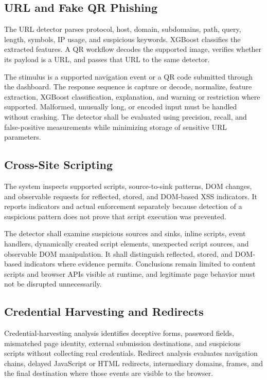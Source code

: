 \subsection{URL and Fake QR Phishing}
The URL detector parses protocol, host, domain, subdomains, path, query, length,
symbols, IP usage, and suspicious keywords. XGBoost classifies the extracted
features. A QR workflow decodes the supported image, verifies whether its payload
is a URL, and passes that URL to the same detector.

The stimulus is a supported navigation event or a QR code submitted through the
dashboard. The response sequence is capture or decode, normalize, feature
extraction, XGBoost classification, explanation, and warning or restriction where
supported. Malformed, unusually long, or encoded input must be handled without
crashing. The detector shall be evaluated using precision, recall, and
false-positive measurements while minimizing storage of sensitive URL parameters.

\subsection{Cross-Site Scripting}
The system inspects supported scripts, source-to-sink patterns, DOM changes, and
observable requests for reflected, stored, and DOM-based XSS indicators. It reports
indicators and actual enforcement separately because detection of a suspicious
pattern does not prove that script execution was prevented.

The detector shall examine suspicious sources and sinks, inline scripts, event
handlers, dynamically created script elements, unexpected script sources, and
observable DOM manipulation. It shall distinguish reflected, stored, and DOM-based
indicators where evidence permits. Conclusions remain limited to content scripts
and browser APIs visible at runtime, and legitimate page behavior must not be
disrupted unnecessarily.

\subsection{Credential Harvesting and Redirects}
Credential-harvesting analysis identifies deceptive forms, password fields,
mismatched page identity, external submission destinations, and suspicious scripts
without collecting real credentials. Redirect analysis evaluates navigation chains,
delayed JavaScript or HTML redirects, intermediary domains, frames, and the final
destination where those events are visible to the browser.

